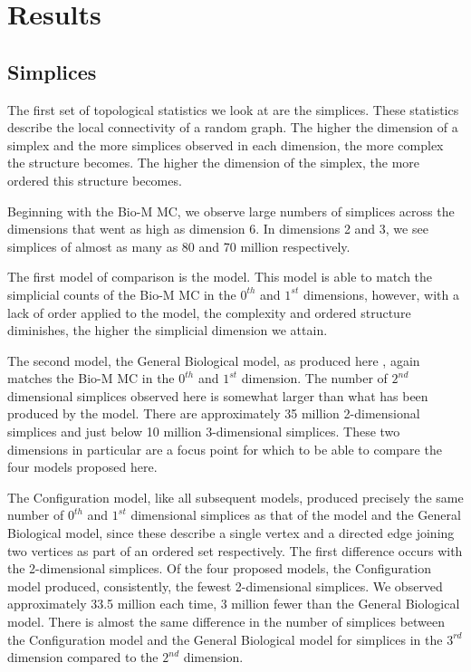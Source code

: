 \section{Results}
\subsection{Simplices}
The first set of topological statistics we look at are the simplices. These statistics describe the local connectivity of a random graph. The higher the dimension of a simplex and the more simplices observed in each dimension, the more complex the structure becomes. The higher the dimension of the simplex, the more ordered this structure becomes.

Beginning with the Bio-M MC, we observe large numbers of simplices across the dimensions that went as high as dimension 6. In dimensions 2 and 3, we see simplices of almost as many as 80 and 70 million respectively. 

The first model of comparison is the \ER model. This model is able to match the simplicial counts of the Bio-M MC in the $0^{th}$ and $1^{st}$ dimensions, however, with a lack of order applied to the model, the complexity and ordered structure diminishes, the higher the simplicial dimension we attain.

The second model, the General Biological model, as produced here \cite{Reimann_2017}, again matches the Bio-M MC in the $0^{th}$ and $1^{st}$ dimension. The number of $2^{nd}$ dimensional simplices observed here is somewhat larger than what has been produced by the \ER model. There are approximately 35 million 2-dimensional simplices and just below 10 million 3-dimensional simplices. These two dimensions in particular are a focus point for which to be able to compare the four models proposed here. 

The Configuration model, like all subsequent models, produced precisely the same number of $0^{th}$ and $1^{st}$ dimensional simplices as that of the \ER model and the General Biological model, since these describe a single vertex and a directed edge joining two vertices as part of an ordered set respectively. The first difference occurs with the 2-dimensional simplices. Of the four proposed models, the Configuration model produced, consistently, the fewest 2-dimensional simplices. We observed approximately 33.5 million each time, 3 million fewer than the General Biological model. There is almost the same difference in the number of simplices between the Configuration model and the General Biological model for simplices in the $3^{rd}$ dimension compared to the $2^{nd}$ dimension.


